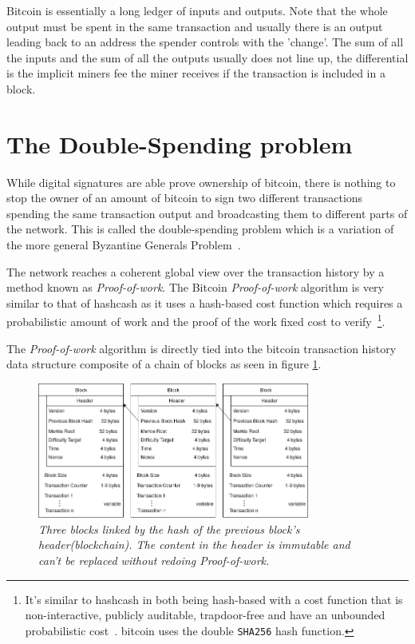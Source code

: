 Bitcoin is essentially a long ledger of inputs and outputs. Note that the whole output must be spent in the same transaction and usually there is an output leading back to an address the spender controls with the 'change'. The sum of all the inputs and the sum of all the outputs usually does not line up, the differential is the implicit miners fee the miner receives if the transaction is included in a block. 

\section{The Double-Spending problem}

While digital signatures are able prove ownership of bitcoin, there is nothing to stop the owner of an amount of bitcoin to sign two different transactions spending the same transaction output and broadcasting them to different parts of the network. This is called the double-spending problem which is a variation of the more general Byzantine Generals Problem~\cite{lamport:shostak:byzantine:generals}.


The network reaches a coherent global view over the transaction history by a method known as \textit{Proof-of-work}. The Bitcoin \textit{Proof-of-work} algorithm is very similar to that of hashcash as it uses a hash-based cost function which requires a probabilistic amount of work and the proof of the work fixed cost to verify~\cite{back:hashcash}\footnote{It's similar to hashcash in both being \gls{hash}-based with a cost function that is non-interactive, publicly auditable, trapdoor-free and have an unbounded probabilistic cost~\cite{back:hashcash}.
\gls{bitcoin} uses the double \texttt{SHA256} hash function.}.

The \textit{Proof-of-work} algorithm is directly tied into the bitcoin transaction history data structure composite of a chain of blocks as seen in figure \ref{fig:blockchain}.

\begin{figure}[!htb]
	\hspace*{-0.4cm} 
	\centering
	\includegraphics[width=9cm]{images/blockchain.png}
	\caption{\textit{Three blocks linked by the hash of the previous block's header(\gls{blockchain}). The content in the header is immutable and can't be replaced without redoing \textit{Proof-of-work}.
	}}
	\label{fig:blockchain}
	\hspace{2mm} 
\end{figure}

